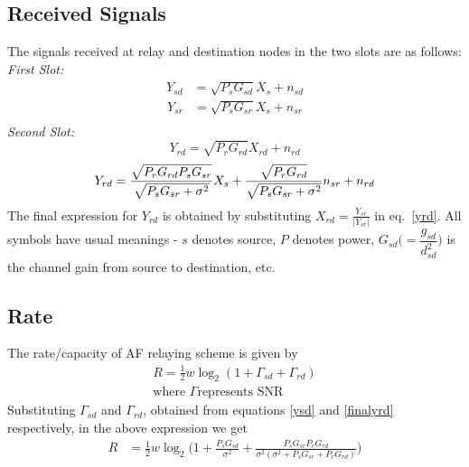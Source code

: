 \documentclass[conference]{IEEEtran}
\begin{document}
\subsection{Received Signals }
The signals received at relay and destination nodes in the two slots are as 
follows:\\
\textit{First Slot:}
\begin{align} \label{ysd}
	Y_{sd} &= \sqrt{P_s G_{sd}} X_s + n_{sd}
\end{align}
\begin{align*}
	Y_{sr} &= \sqrt{P_s G_{sr}} X_s + n_{sr} \\
\end{align*}
\textit{Second Slot:}
\begin{equation}\label{yrd}
	Y_{rd} = \sqrt{P_r G_{rd}} X_{rd} + n_{rd} 
\end{equation}
\begin{equation} \label{finalyrd}
	Y_{rd} = \frac{\sqrt{\mathstrut P_r G_{rd} P_s G_{sr}}}{\sqrt{\mathstrut 
	P_s G_{sr} + \sigma^2}}X_s + \frac{\sqrt{\mathstrut P_rG_{rd}}}{\sqrt{\mathstrut 
	P_s G_{sr} + \sigma^2}} n_{sr} + n_{rd} 
\end{equation}
The final expression for $Y_{rd}$ is obtained by substituting
$X_{rd} = \frac{Y_{sr}}{|Y_{sr}|}$ in eq.~\ref{yrd}. All symbols have usual
meanings - $s$ denotes source, $P$ denotes power, $G_{sd}\big(=\dfrac{g_{sd}}
{d^2_{sd}}\big)$ is the channel gain from source to destination, etc.
\subsection{Rate}
The rate/capacity of AF relaying scheme is given by
\begin{align*}
	R = \frac{1}{2} w \log_2(1+\Gamma_{sd}+\Gamma_{rd}) 
	\\ \text{where $\Gamma$
represents SNR}
\end{align*}
Substituting $\Gamma_{sd}$ and $\Gamma_{rd}$, obtained from equations \ref{ysd}
and \ref{finalyrd} respectively, in the above expression we get
\begin{align*}
	R &= \frac{1}{2} w \log_2\bigg(1+\frac{P_s G_{sd}}{\sigma^2} +
	\frac{P_s G_{sr} P_r G_{rd}}{\sigma^2(\sigma^2 + P_sG_{sr} + P_rG_{rd})}\bigg)
\end{align*}
\end{document}
